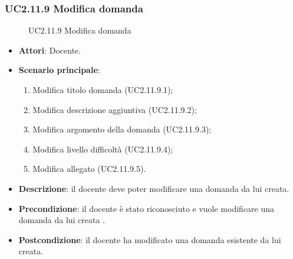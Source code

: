 \subsubsection{UC2.11.9 Modifica domanda}
\begin{figure}[H]
\centering
\noindent{}
\caption{UC2.11.9 Modifica domanda}
\end{figure}
\begin{itemize}
\item \textbf{Attori}: Docente.
\item \textbf{Scenario principale}:
\begin{enumerate}
\item Modifica titolo domanda
 (UC2.11.9.1);
\item Modifica descrizione aggiuntiva (UC2.11.9.2);
\item Modifica argomento della domanda (UC2.11.9.3);
\item Modifica livello difficoltà (UC2.11.9.4);
\item Modifica allegato (UC2.11.9.5).
\end{enumerate}
\item \textbf{Descrizione}: il docente deve poter modificare una domanda da lui creata.
\item \textbf{Precondizione}: il docente è stato riconosciuto e vuole modificare una domanda da lui creata
.
\item \textbf{Postcondizione}: il docente ha modificato una domanda esistente da lui creata.
\end{itemize}
